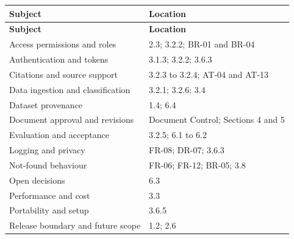 \documentclass[11pt,letterpaper]{article}
\begin{document}
\begin{longtable}{|P{\arrayrulewidth\relax}|P{\arrayrulewidth\relax}|}

\hline{}

\textbf{Subject} & \textbf{Location} \\ \hline

\endfirsthead

\hline{}

\textbf{Subject} & \textbf{Location} \\ \hline

\endhead

\hline\endfoot

\hline\endlastfoot

Access permissions and roles & 2.3; 3.2.2; BR-01 and BR-04 \\ \hline

Authentication and tokens & 3.1.3; 3.2.2; 3.6.3 \\ \hline

Citations and source support & 3.2.3 to 3.2.4; AT-04 and AT-13 \\ \hline

Data ingestion and classification & 3.2.1; 3.2.6; 3.4 \\ \hline

Dataset provenance & 1.4; 6.4 \\ \hline

Document approval and revisions & Document Control; Sections 4 and 5 \\ \hline

Evaluation and acceptance & 3.2.5; 6.1 to 6.2 \\ \hline

Logging and privacy & FR-08; DR-07; 3.6.3 \\ \hline

Not-found behaviour & FR-06; FR-12; BR-05; 3.8 \\ \hline

Open decisions & 6.3 \\ \hline

Performance and cost & 3.3 \\ \hline

Portability and setup & 3.6.5 \\ \hline

Release boundary and future scope & 1.2; 2.6 \\ \hline

\end{longtable}

\endgroup
\end{document}
